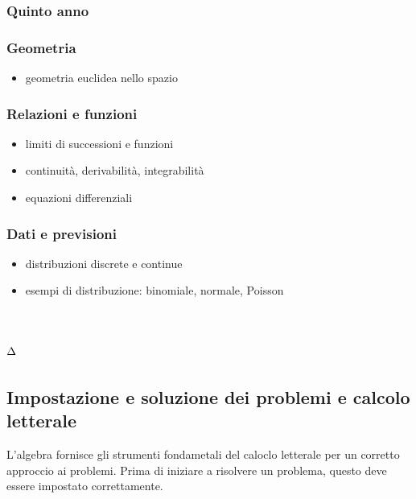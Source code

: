 \documentclass[letterpaper,10pt,italian]{jupyterBook}
\begin{document}
\subsubsection*{Quinto anno}
\subsubsection*{Geometria}
\begin{itemize}
\item {} 
\sphinxAtStartPar
geometria euclidea nello spazio

\end{itemize}
\subsubsection*{Relazioni e funzioni}
\begin{itemize}
\item {} 
\sphinxAtStartPar
limiti di successioni e funzioni

\item {} 
\sphinxAtStartPar
continuità, derivabilità, integrabilità

\item {} 
\sphinxAtStartPar
equazioni differenziali

\end{itemize}
\subsubsection*{Dati e previsioni}
\begin{itemize}
\item {} 
\sphinxAtStartPar
distribuzioni discrete e continue

\item {} 
\sphinxAtStartPar
esempi di distribuzione: binomiale, normale, Poisson

\end{itemize}

\sphinxstepscope


\section{\protect\(\Delta\protect\)}
\label{\detokenize{ch/program/delta:delta}}\label{\detokenize{ch/program/delta:math-hs-program-delta}}\label{\detokenize{ch/program/delta::doc}}

\subsection{Impostazione e soluzione dei problemi e calcolo letterale}
\label{\detokenize{ch/program/delta:impostazione-e-soluzione-dei-problemi-e-calcolo-letterale}}\label{\detokenize{ch/program/delta:math-hs-program-delta-setup}}
\sphinxAtStartPar
L’algebra fornisce gli strumenti fondametali del caloclo letterale per un corretto approccio ai problemi. Prima di iniziare a risolvere un problema, questo deve essere impostato correttamente.
\end{document}

